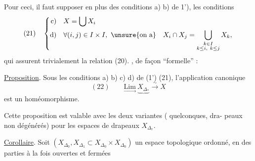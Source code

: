 Pour ceci, il faut supposer en plus des
conditions a) b) de 1'), les conditions
\[
(21)\quad\left\{\begin{aligned}
\text{c)}\quad&X=\bigcup X_i\\
\text{d)}\quad&\forall(i,j)\in I\times I,\ \text{\unsure{on a}}\quad
X_i\cap X_j=\bigcup_{\substack{k\in I\\k\leq i,\ k\leq j}}X_k,
\end{aligned}\right.
\]
qui assurent trivialement la relation (20).
, de façon ``formelle'' :

\uline{Proposition}. Sous les conditions a) b) c) d)
de (1') (21), l'application canonique
\[
(22)\qquad\underset{\longrightarrow}{\mathrm{Lim}}\ \underbrace{X_{\Delta_*}}\xrightarrow{\sim}X
\]
est un homéomorphisme.

Cette proposition est valable avec les
deux variantes ( quelconques, dra-
peaux non dégénérés) pour les
espaces de drapeaux $X_{\Delta_r}$.

\uline{Corollaire}. Soit $(X_{\Delta_0},X_{\Delta_1}\subset X_{\Delta_0}\times X_{\Delta_0})$
un espace topologique ordonné, 
 en des parties à la fois ouvertes et fermées
